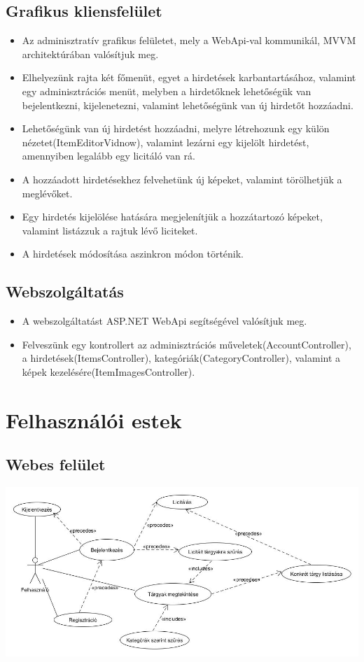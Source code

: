 \documentclass[12pt,a4paper]{article}
\begin{document}
\subsection{Grafikus kliensfelület}
\begin{itemize}
\item Az adminisztratív grafikus felületet, mely a WebApi-val kommunikál, MVVM architektúrában valósítjuk meg.
\item Elhelyezünk rajta két főmenüt, egyet a hirdetések karbantartásához, valamint egy adminisztrációs menüt, melyben a hirdetőknek lehetőségük van bejelentkezni, kijelenetezni, valamint lehetőségünk van új hirdetőt hozzáadni.
\item Lehetőségünk van új hirdetést hozzáadni, melyre létrehozunk egy külön nézetet(ItemEditorVidnow), valamint lezárni egy kijelölt hirdetést, amennyiben legalább egy licitáló van rá.
\item A hozzáadott hirdetésekhez felvehetünk új képeket, valamint törölhetjük a meglévőket.
\item Egy hirdetés kijelölése hatására megjelenítjük a hozzátartozó képeket, valamint listázzuk a rajtuk lévő liciteket.
\item A hirdetések módosítása aszinkron módon történik.
\end{itemize}

\subsection{Webszolgáltatás}
\begin{itemize}
\item A webszolgáltatást ASP.NET WebApi segítségével valósítjuk meg.
\item Felveszünk egy kontrollert az adminisztrációs műveletek(AccountController), a hirdetések(ItemsController), kategóriák(CategoryController), valamint a képek kezelésére(ItemImagesController).
\end{itemize}

\section{Felhasználói estek}
\subsection{Webes felület}
\includegraphics[scale=0.5]{felhasznaloi_diag.jpg}
\end{document}
